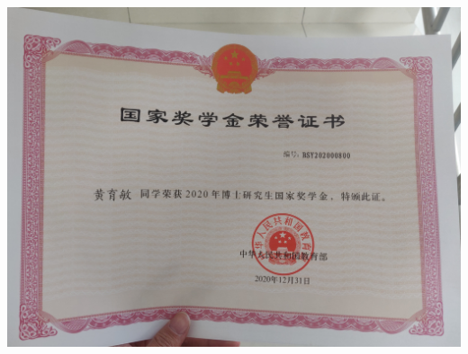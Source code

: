 \documentclass[]{article}
\begin{document}
\includegraphics[width=1\textwidth,height=\textheight]{figures/guojiang.jpeg}
\end{document}
